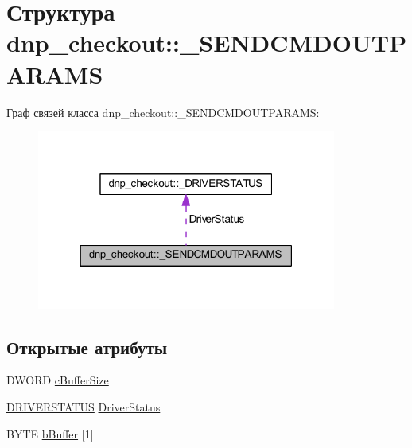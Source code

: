 \hypertarget{structdnp__checkout_1_1___s_e_n_d_c_m_d_o_u_t_p_a_r_a_m_s}{\section{Структура dnp\-\_\-checkout\-:\-:\-\_\-\-S\-E\-N\-D\-C\-M\-D\-O\-U\-T\-P\-A\-R\-A\-M\-S}
\label{structdnp__checkout_1_1___s_e_n_d_c_m_d_o_u_t_p_a_r_a_m_s}
}


Граф связей класса dnp\-\_\-checkout\-:\-:\-\_\-\-S\-E\-N\-D\-C\-M\-D\-O\-U\-T\-P\-A\-R\-A\-M\-S\-:
\nopagebreak
\begin{figure}[H]
\begin{center}
\leavevmode
\includegraphics[width=279pt]{structdnp__checkout_1_1___s_e_n_d_c_m_d_o_u_t_p_a_r_a_m_s__coll__graph}
\end{center}
\end{figure}
\subsection*{Открытые атрибуты}
\begin{DoxyCompactItemize}
\item 
D\-W\-O\-R\-D \hyperlink{structdnp__checkout_1_1___s_e_n_d_c_m_d_o_u_t_p_a_r_a_m_s_afa3ffd902c48f6d0a5eb15214702bda0}{c\-Buffer\-Size}
\item 
\hyperlink{namespacednp__checkout_a4a8d9b7c57ae5e7d0d88f7a5be282c57}{D\-R\-I\-V\-E\-R\-S\-T\-A\-T\-U\-S} \hyperlink{structdnp__checkout_1_1___s_e_n_d_c_m_d_o_u_t_p_a_r_a_m_s_a2d8a7d4790efc42354257b48a3dccc01}{Driver\-Status}
\item 
B\-Y\-T\-E \hyperlink{structdnp__checkout_1_1___s_e_n_d_c_m_d_o_u_t_p_a_r_a_m_s_aef7cba9886b5a6307a39a884bc0fab3d}{b\-Buffer} \mbox{[}1\mbox{]}
\end{DoxyCompactItemize}


